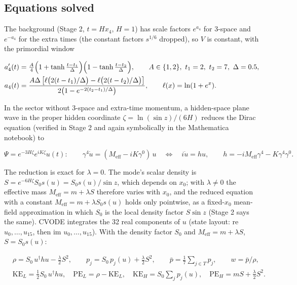 \documentclass[11pt]{article}
\begin{document}
\subsection{Equations solved}

The background (Stage 2, $t=Hx_4$, $H=1$) has scale factors $e^{a_4}$ for 3-space and $e^{-a_4}$ for the extra times (the constant factors $s^{1/6}$ dropped), so $V$ is constant, with the primordial window

\[
\begin{aligned}
&a_4'(t)=\tfrac A4\Bigl(1+\tanh\tfrac{t-t_1}{\Delta}\Bigr)\Bigl(1-\tanh\tfrac{t-t_2}{\Delta}\Bigr),\qquad A\in\{1,2\},\ t_1=2,\ t_2=7,\ \Delta=0.5,\\
&a_4(t)=\frac{A\Delta\,\bigl[\ell\bigl(2(t-t_1)/\Delta\bigr)-\ell\bigl(2(t-t_2)/\Delta\bigr)\bigr]}{2\bigl(1-e^{-2(t_2-t_1)/\Delta}\bigr)},\qquad \ell(x)=\ln(1+e^x).
\end{aligned}
\]

In the sector without 3-space and extra-time momentum, a hidden-space plane wave in the proper hidden coordinate $\zeta=\ln(\sin z)/(6H)$ reduces the Dirac equation (verified in Stage 2 and again symbolically in the Mathematica notebook) to

\[
\Psi=e^{-3H\zeta}e^{iK\zeta}u(t):\qquad \gamma^4\dot u=(M_{\mathrm{eff}}-iK\gamma^0)\,u\quad\Longleftrightarrow\quad i\dot u=hu,\qquad h=-iM_{\mathrm{eff}}\gamma^4-K\gamma^4\gamma^0 .
\]

The reduction is exact for $\lambda=0$. The mode's scalar density is $S=e^{-6H\zeta}S_0s(u)=S_0s(u)/\sin z$, which depends on $x_0$; with $\lambda\ne0$ the effective mass $M_{\mathrm{eff}}=m+\lambda S$ therefore varies with $x_0$, and the reduced equation with a constant $M_{\mathrm{eff}}=m+\lambda S_0s(u)$ holds only pointwise, as a fixed-$x_0$ mean-field approximation in which $S_0$ is the local density factor $S\sin z$ (Stage 2 says the same). CVODE integrates the 32 real components of $u$ (state layout: re $u_0,\dots,u_{15}$, then im $u_0,\dots,u_{15}$). With the density factor $S_0$ and $M_{\mathrm{eff}}=m+\lambda S$, $S=S_0s(u)$:

\[
\begin{aligned}
&\rho=S_0\,u^\dagger hu-\tfrac\lambda2S^2,\qquad p_j=S_0\,p_j(u)+\tfrac\lambda2S^2,\qquad \bar p=\tfrac17\sum_{j\in T}p_j,\qquad w=\bar p/\rho,\\
&\mathrm{KE}_L=\tfrac12S_0\,u^\dagger hu,\quad \mathrm{PE}_L=\rho-\mathrm{KE}_L,\quad \mathrm{KE}_H=S_0\sum_jp_j(u),\quad \mathrm{PE}_H=mS+\tfrac\lambda2S^2 .
\end{aligned}
\]
\end{document}
